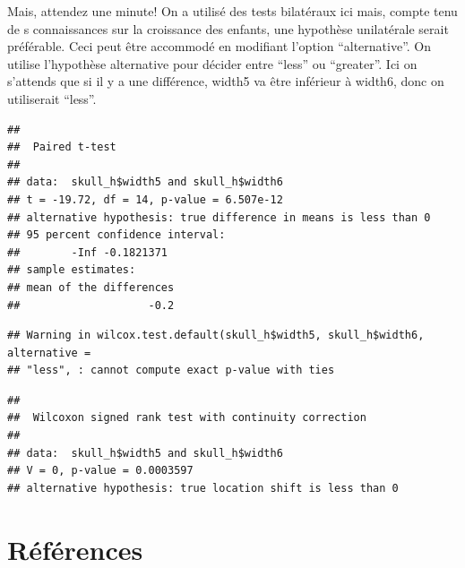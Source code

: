\documentclass[12pt,]{book}
\newenvironment{Shaded}{\begin{snugshade}}{\end{snugshade}}
\newcommand{\DataTypeTok}[1]{\textcolor[rgb]{0.27,0.27,0.27}{#1}}
\newcommand{\KeywordTok}[1]{\textcolor[rgb]{0.27,0.27,0.27}{\textbf{#1}}}
\newcommand{\NormalTok}[1]{#1}
\newcommand{\OperatorTok}[1]{\textcolor[rgb]{0.43,0.43,0.43}{\textbf{#1}}}
\newcommand{\OtherTok}[1]{\textcolor[rgb]{0.37,0.37,0.37}{#1}}
\newcommand{\StringTok}[1]{\textcolor[rgb]{0.5,0.5,0.5}{#1}}
\begin{document}
Mais, attendez une minute! On a utilisé des tests bilatéraux ici mais, compte tenu de s connaissances sur la croissance des enfants, une hypothèse unilatérale serait préférable. Ceci peut être accommodé en modifiant l'option ``alternative''. On utilise l'hypothèse alternative pour décider entre ``less'' ou ``greater''. Ici on s'attends que si il y a une différence, width5 va être inférieur à width6, donc on utiliserait ``less''.

\begin{Shaded}
\end{Shaded}

\begin{verbatim}
## 
## 	Paired t-test
## 
## data:  skull_h$width5 and skull_h$width6
## t = -19.72, df = 14, p-value = 6.507e-12
## alternative hypothesis: true difference in means is less than 0
## 95 percent confidence interval:
##        -Inf -0.1821371
## sample estimates:
## mean of the differences 
##                    -0.2
\end{verbatim}

\begin{Shaded}
\end{Shaded}

\begin{verbatim}
## Warning in wilcox.test.default(skull_h$width5, skull_h$width6, alternative =
## "less", : cannot compute exact p-value with ties
\end{verbatim}

\begin{verbatim}
## 
## 	Wilcoxon signed rank test with continuity correction
## 
## data:  skull_h$width5 and skull_h$width6
## V = 0, p-value = 0.0003597
## alternative hypothesis: true location shift is less than 0
\end{verbatim}

\hypertarget{ruxe9fuxe9rences}{%
\section{Références}\label{ruxe9fuxe9rences}}
\end{document}
